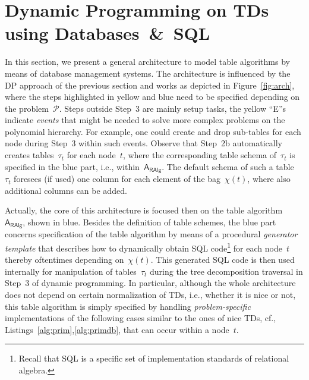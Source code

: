 \documentclass{llncs}
\newcommand{\algo}[1]{\ensuremath{\mathsf{#1}}}
\newcommand{\tab}[1]{\ensuremath{\tau_{#1}}}
\begin{document}
\section{Dynamic Programming on TDs using Databases~\&~SQL}
%
%
%
%
In this section, we present a general architecture to model table algorithms
by means of database management systems.
The architecture is influenced by the DP approach of the previous section
and works as depicted in Figure~\ref{fig:arch},
where the steps highlighted in yellow and blue need to be specified
depending on the problem~$\mathcal{P}$. Steps outside Step~3 are mainly setup tasks,
the yellow ``E''s indicate \emph{events} that might be needed to solve more complex problems
on the polynomial hierarchy. 
For example, one could create and drop sub-tables for each node during Step~3 within such events.
Observe that Step~2b automatically creates tables~$\tab{t}$ for each node~$t$,
where the corresponding table schema of~$\tab{t}$ is specified in the blue part, i.e., 
within~$\algo{A_{RAlg}}$. 
The default schema of such a table~$\tab{t}$ foresees (if used) one column for each element of the bag~$\chi(t)$, where also additional columns can be added.

Actually, the core of this architecture is focused then on the table algorithm~$\algo{A_{RAlg}}$, shown in blue. 
Besides the definition of table schemes, the blue part concerns specification of the table algorithm by means of a procedural \emph{generator template} that describes 
how to dynamically obtain SQL code\footnote{Recall that SQL is a specific set of implementation standards of relational algebra.} for each node~$t$ thereby oftentimes depending on~$\chi(t)$.
This generated SQL code is then used internally for manipulation of 
tables~$\tab{t}$ during the tree decomposition 
traversal in Step~3 of dynamic programming.
%
In particular, although the whole architecture does not depend 
on certain normalization of TDs, i.e., whether it is nice or not, 
this table algorithm is simply specified by handling \emph{problem-specific} implementations
of the following cases similar to the ones of nice TDs, cf., Listings~\ref{alg:prim},\ref{alg:primdb}, that can occur within a node~$t$.
\end{document}
